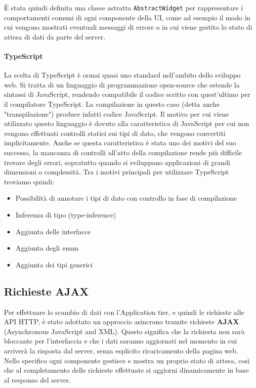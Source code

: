 È stata quindi definita una classe astratta \texttt{AbstractWidget} per rappresentare
i comportamenti comuni di ogni componente della UI, come ad esempio il modo in cui
vengono mostrati eventuali messaggi di errore o in cui viene gestito lo stato di
attesa di dati da parte del server.

\paragraph{TypeScript}
La scelta di TypeScript \cite{typescriptlang} è ormai quasi uno standard nell'ambito dello sviluppo web.
Si tratta di un linguaggio di programmazione open-source che estende la sintassi
di JavaScript, rendendo compatibile il codice scritto con quest'ultimo per il
compilatore TypeScript. La compilazione in questo caso (detta anche
"transpilazione") produce infatti codice JavaScript.
Il motivo per cui viene utilizzato questo linguaggio è dovuto alla caratteristica
di JavaScript per cui non vengono effettuati controlli statici sui tipi di dato,
che vengono convertiti implicitamente. Anche se questa caratteristica è stata uno
dei motivi del suo successo, la mancanza di controlli all'atto della compilazione
rende più difficile trovare degli errori, sopratutto quando si sviluppano
applicazioni di grandi dimensioni o complessità.
Tra i motivi principali per utilizzare TypeScript troviamo quindi:
\begin{itemize}
	\item Possibilità di annotare i tipi di dato con controllo in fase di compilazione
	\item Inferenza di tipo (type-inference)
	\item Aggiunta delle interfacce
	\item Aggiunta degli enum
	\item Aggiunta dei tipi generici
\end{itemize}


\subsection{Richieste AJAX}
Per effettuare lo scambio di dati con l'Application tier, e quindi le richieste
alle API HTTP, è stato adottato un approccio asincrono tramite richieste
\textbf{AJAX} (Asynchronous JavaScript and XML). Questo significa che la richiesta
non sarà bloccante per l'interfaccia e che i dati saranno aggiornati nel momento
in cui arriverà la risposta dal server, senza esplicito ricaricamento della pagina
web. Nello specifico ogni componente gestisce e mostra un proprio stato di attesa,
così che al completamento delle richieste effettuate si aggiorni dinamicamente in
base al responso del server.


